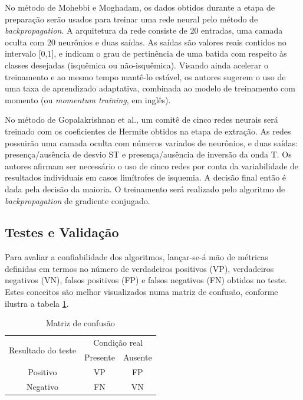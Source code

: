 No método de Mohebbi e Moghadam, os dados obtidos durante a etapa de preparação serão usados para treinar uma rede neural pelo método de \emph{backpropagation}. A arquitetura da rede consiste de 20 entradas, uma camada oculta com 20 neurônios e duas saídas. As saídas são valores reais contidos no intervalo [0,1], e indicam o grau de pertinência de uma batida com respeito às classes desejadas (isquêmica ou não-isquêmica). Visando ainda acelerar o treinamento e ao mesmo tempo mantê-lo estável, os autores sugerem o uso de uma taxa de aprendizado adaptativa, combinada ao modelo de treinamento com momento (ou \emph{momentum training}, em inglês).

No método de Gopalakrishnan et al., um comitê de cinco redes neurais será treinado com os coeficientes de Hermite obtidos na etapa de extração. As redes possuirão uma camada oculta com números variados de neurônios, e duas saídas: presença/ausência de desvio ST e presença/ausência de inversão da onda T. Os autores afirmam ser necessário o uso de cinco redes por conta da variabilidade de resultados individuais em casos limítrofes de isquemia. A decisão final então é dada pela decisão da maioria. O treinamento será realizado pelo algoritmo de \emph{backpropagation} de gradiente conjugado.

\subsection{Testes e Validação}
Para avaliar a confiabilidade dos algoritmos, lançar-se-á mão de métricas definidas em termos no número de verdadeiros positivos (VP), verdadeiros negativos (VN), falsos positivos (FP) e falsos negativos (FN) obtidos no teste. Estes conceitos são melhor visualizados numa matriz de confusão, conforme ilustra a tabela \ref{tab:confusion_matrix}.

\begin{table}[ht] 
    \caption{Matriz de confusão}
    \centering
    \begin{tabular}{ccc}
        \toprule
        \multirow{2}{2cm}{Resultado do teste} &
        \multicolumn{2}{c}{Condição real} \\
        \cmidrule{2-3}
        & Presente & Ausente \\ 
        \midrule
        Positivo & VP & FP \\
        \midrule
        Negativo & FN & VN \\
        \bottomrule
    \end{tabular} 
    \label{tab:confusion_matrix}
\end{table}

